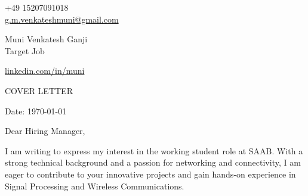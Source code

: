 \documentclass[11pt,a4]{article}
\begin{document}
\begin{center}
    \begin{minipage}[b]{0.24\textwidth}
            \large +49 15207091018 \\
            \large \href{mailto:g.m.venkateshmuni@gmail.com}{g.m.venkateshmuni@gmail.com} 
    \end{minipage}%
    \begin{minipage}[b]{0.5\textwidth}
            \centering
            {\Huge Muni Venkatesh Ganji} \\ %
            \vspace{0.1cm}
            {\color{UI_blue} \Large{Target Job}} \\
    \end{minipage}%
    \begin{minipage}[b]{0.24\textwidth}
            \flushright \large
            {\href{https://www.linkedin.com/in/muni-venkatesh-ganji/}{linkedin.com/in/muni} } 
    \end{minipage}   
    
\vspace{-0.15cm} 
{\color{UI_blue} \hrulefill}
\end{center}

\justify
\setlength{\parindent}{0pt}
\setlength{\parskip}{12pt}
\vspace{0.2cm}
\begin{center}
    {\color{UI_blue} \Large{COVER LETTER}}
\end{center}



Date: \today \par \vspace{-0.1cm}
Dear Hiring Manager, %

\par I am writing to express my interest in the working student role at SAAB. With a strong technical background and a passion for networking and connectivity, I am eager to contribute to your innovative projects and gain hands-on experience in Signal Processing and Wireless Communications.
\end{document}
